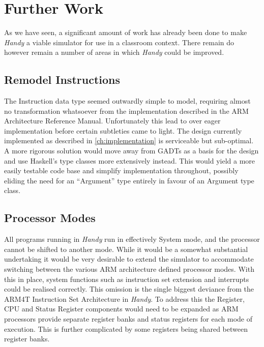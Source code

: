 
\chapter{Further Work} %

\label{ch:furtherwork} %

As we have seen, a significant amount of work has already been done to make \emph{Handy} a viable simulator for use in a classroom context. There remain do however remain a number of areas in which \emph{Handy} could be improved.


\section{Remodel Instructions}

The Instruction data type seemed outwardly simple to model, requiring almost no transformation whatsoever from the implementation described in the ARM Architecture Reference Manual.  Unfortunately this lead to over eager implementation before certain subtleties came to light. The design currently implemented as described in \autoref{ch:implementation} is serviceable but sub-optimal. A more rigorous solution would move away from GADTs as a basis for the design and use Haskell's type classes more extensively instead. This would yield a more easily testable code base and simplify implementation throughout, possibly eliding the need for an ``Argument'' type entirely in favour of an Argument type class.


\section{Processor Modes}

All programs running in \emph{Handy} run in effectively System mode, and the processor cannot be shifted to another mode. While it would be a somewhat substantial undertaking it would be very desirable to extend the simulator to accommodate switching between the various ARM architecture defined processor modes. With this in place, system functions such as instruction set extension and interrupts could be realised correctly. This omission is the single biggest deviance from the ARM4T Instruction Set Architecture in \emph{Handy}. To address this the Register, CPU and Status Register components would need to be expanded as ARM processors provide separate register banks and status registers for each mode of execution. This is further complicated by some registers being shared between register banks.


